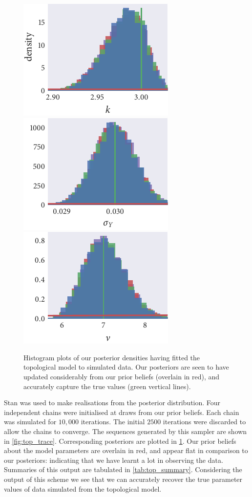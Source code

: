 \begin{figure}[tbp]
  \includegraphics{top_hist_k.pdf}%
  \includegraphics{top_hist_sigma_Y.pdf}%
  \includegraphics{top_hist_nu.pdf}
  \caption{Histogram plots of our posterior densities having fitted the
    topological model to simulated data. Our posteriors are seen to have
    updated considerably from our prior beliefs (overlain in red), and accurately
    capture the true values (green vertical lines).}
  \label{fig:top_hist}
\end{figure}

Stan was used to make realisations from the posterior distribution. Four
independent chains were initialised at draws from our prior beliefs. Each chain
was simulated for $10,000$ iterations. The initial $2500$ iterations were
discarded to allow the chains to converge. The sequences generated by this
sampler are shown in \cref{fig:top_trace}. Corresponding posteriors are
plotted in \cref{fig:top_hist}. Our prior beliefs about the model parameters
are overlain in red, and appear flat in comparison to our posteriors:
indicating that we have learnt a lot in observing the data. Summaries of this
output are tabulated in \cref{tab:top_summary}. Considering the output of this
scheme we see that we can accurately recover the true parameter values of data
simulated from the topological model.

